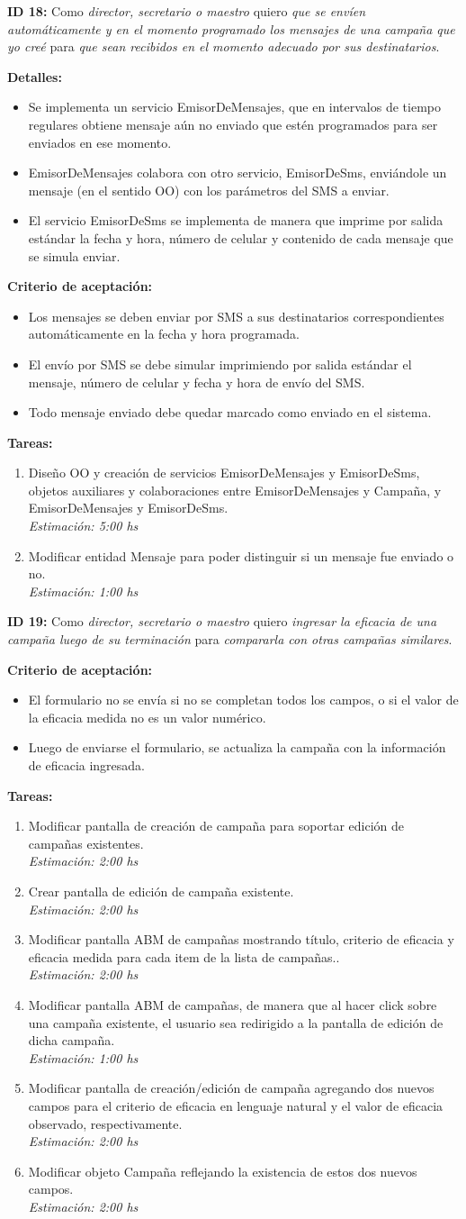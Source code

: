 \documentclass[a4paper, 10pt, twoside]{article}
\newcommand{\sprintstory}[4]{
  \noindent
  \textbf{ID #1:} Como \emph{#2} quiero \emph{#3} para \emph{#4}.
}
\newenvironment{detalles}{
  \textbf{Detalles:}
  \begin{itemize}
}{
  \end{itemize}
}
\newcommand{\detalle}[1] {
  \item #1.
}
\newenvironment{criterios}{
  \textbf{Criterio de aceptación:}
  \begin{itemize}
}{
  \end{itemize}
}
\newcommand{\criterio}[1] {
  \item #1
}
\newenvironment{tasks}{
  \textbf{Tareas:}
  \begin{enumerate}
}{
  \end{enumerate}
}
\newcommand{\task}[2] {
  \item #1.\\
  \emph{Estimación: #2 hs}
}
\begin{document}
\sprintstory{18}
            {director, secretario o maestro}
            {que se envíen automáticamente y en el momento programado los mensajes de una campaña que yo creé}
            {que sean recibidos en el momento adecuado por sus destinatarios}

\begin{detalles}
  \detalle{Se implementa un servicio EmisorDeMensajes, que en intervalos de tiempo regulares obtiene mensaje aún no enviado que estén programados para ser enviados en ese momento}
  \detalle{EmisorDeMensajes colabora con otro servicio, EmisorDeSms, enviándole un mensaje (en el sentido OO) con los parámetros del SMS a enviar}
  \detalle{El servicio EmisorDeSms se implementa de manera que imprime por salida estándar la fecha y hora, número de celular y contenido de cada mensaje que se simula enviar}
\end{detalles}

\begin{criterios}
  \criterio{Los mensajes se deben enviar por SMS a sus destinatarios correspondientes automáticamente en la fecha y hora programada.}
  \criterio{El envío por SMS se debe simular imprimiendo por salida estándar el mensaje, número de celular y fecha y hora de envío del SMS.}
  \criterio{Todo mensaje enviado debe quedar marcado como enviado en el sistema.}
\end{criterios}

\begin{tasks}
  \task{Diseño OO y creación de servicios EmisorDeMensajes y EmisorDeSms, objetos auxiliares y colaboraciones entre EmisorDeMensajes y Campaña, y EmisorDeMensajes y EmisorDeSms}{5:00}
  \task{Modificar entidad Mensaje para poder distinguir si un mensaje fue enviado o no}{1:00}
\end{tasks}


\sprintstory{19}
            {director, secretario o maestro}
            {ingresar la eficacia de una campaña luego de su terminación}
            {compararla con otras campañas similares}

\begin{criterios}
  \criterio{El formulario no se envía si no se completan todos los campos, o si el valor de la eficacia medida no es un valor numérico.}
  \criterio{Luego de enviarse el formulario, se actualiza la campaña con la información de eficacia ingresada.}
\end{criterios}

\begin{tasks}
  \task{Modificar pantalla de creación de campaña para soportar edición de campañas existentes}{2:00}
  \task{Crear pantalla de edición de campaña existente}{2:00}
  \task{Modificar pantalla ABM de campañas mostrando título, criterio de eficacia y eficacia medida para cada item de la lista de campañas.}{2:00}
  \task{Modificar pantalla ABM de campañas, de manera que al hacer click sobre una campaña existente, el usuario sea redirigido a la pantalla de edición de dicha campaña}{1:00}
  \task{Modificar pantalla de creación/edición de campaña agregando dos nuevos campos para el criterio de eficacia en lenguaje natural y el valor de eficacia observado, respectivamente}{2:00}
  \task{Modificar objeto Campaña reflejando la existencia de estos dos nuevos campos}{2:00}
\end{tasks}
\end{document}
